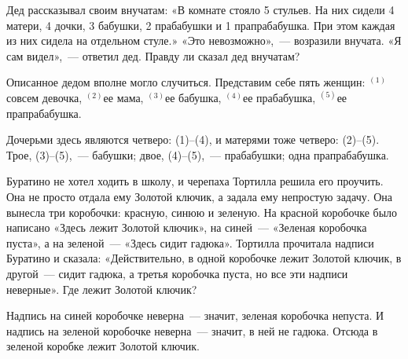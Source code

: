\begin{itemize}

\itA Дед рассказывал своим внучатам: «В комнате стояло 5 стульев. На них сидели 4 матери, 4 дочки, 3 бабушки, 2 прабабушки и 1 прапрабабушка. При этом каждая из них сидела на отдельном стуле.» «Это невозможно»,~— возразили внучата. «Я сам видел»,~— ответил дед. Правду ли сказал дед внучатам?

\def\upno#1{$ ^{(\text{#1})}$}
\itr Описанное дедом вполне могло случиться. Представим себе пять женщин: \upno{1}совсем девочка, \upno{2}ее мама, \upno{3}ее бабушка, \upno{4}ее прабабушка, \upno{5}ее прапрабабушка.

Дочерьми здесь являются четверо: (1)–(4), и матерями тоже четверо: (2)–(5). Трое, (3)–(5),~— бабушки; двое, (4)–(5),~— прабабушки; одна прапрабабушка.

\itC Буратино не хотел ходить в школу, и черепаха Тортилла решила его проучить. Она не просто отдала ему Золотой ключик, а задала ему непростую задачу. Она вынесла три коробочки: красную, синюю и зеленую. На красной коробочке было написано «Здесь лежит Золотой ключик», на синей~— «Зеленая коробочка пуста», а на зеленой~— «Здесь сидит гадюка». Тортилла прочитала надписи Буратино и сказала: «Действительно, в одной коробочке лежит Золотой ключик, в другой~— сидит гадюка, а третья коробочка пуста, но все эти надписи неверные». Где лежит Золотой ключик?

\itr Надпись на синей коробочке неверна~— значит, зеленая коробочка непуста. И надпись на зеленой коробочке неверна~— значит, в ней не гадюка. Отсюда в зеленой коробке лежит Золотой ключик.

\end{itemize}